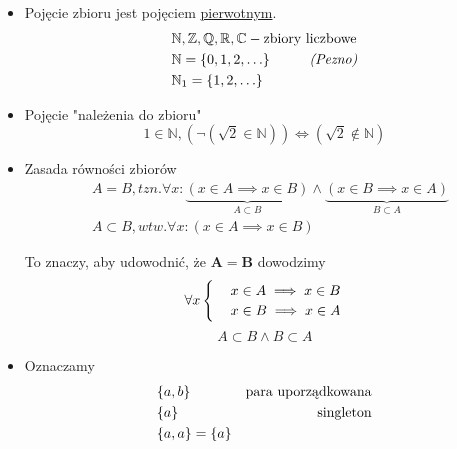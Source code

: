 \documentclass[a5paper,8pt]{article}
\theoremstyle{mythmstyle}
\newcommand\tab[1][1cm]{\hspace*{#1}}
\begin{document}
        \begin{itemize}
            \item Pojęcie zbioru jest pojęciem \underline{pierwotnym}.
                \begin{align*}
                    & \mathbb{N}, \mathbb{Z}, \mathbb{Q}, \mathbb{R}, \mathbb{C} - \text{zbiory liczbowe} \\
                    & \mathbb{N} = \{0, 1, 2, \ldots\} \text{\tab \textit{(Pezno)}} \\
                    & \mathbb{N}_{1} = \{1, 2, \ldots\}
                \end{align*}

            \item Pojęcie "należenia do zbioru"
                \begin{equation*}
                    1 \in \mathbb{N}, (\neg (\sqrt{2} \in \mathbb{N} )) \iff (\sqrt{2} \notin \mathbb{N})
                \end{equation*}

            \item Zasada równości zbiorów
                \begin{align*}
                    & A = B, tzn. \forall x : \underbrace{(x \in A \implies x \in B)}_{A \subset B} \wedge \underbrace{(x \in B \implies x \in A)}_{B \subset A} \\
                    & A \subset B, wtw. \forall x : (x \in A \implies x \in B)
                \end{align*}

                To znaczy, aby udowodnić, że $ \mathbf{A = B} $ dowodzimy
                \begin{equation*}
                  \forall x \begin{cases}
                    & x \in A \implies x \in B \\
                    & x \in B \implies x \in A
                  \end{cases} \\
                \end{equation*}
                \begin{equation*}
                    A \subset B \wedge B \subset A
                \end{equation*}

            \item Oznaczamy
                \begin{align*}
                    & \{a, b\} \tab & \text{para uporządkowana} \\
                    & \{a\} & \text{singleton} \\
                    & \{a, a\} = \{a\}  \\
                \end{align*}


\end{itemize}
\end{document}
